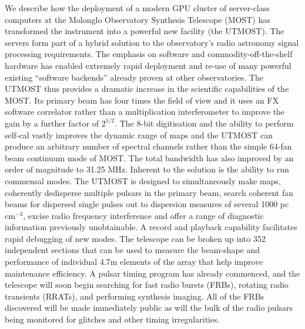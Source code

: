 We describe how the deployment of a modern GPU cluster of server-class computers at the Molonglo Observatory Synthesis Telescope (MOST) has transformed the instrument into a powerful new facility (the UTMOST). The servers form part of a hybrid solution to the observatory's radio astronomy signal processing requirements. The emphasis on software and commodity-off-the-shelf hardware has enabled extremely rapid deployment and re-use of many powerful existing ``software backends'' already proven at other observatories. The UTMOST thus provides a dramatic increase in the scientific capabilities of the MOST. Its primary beam has four times the field of view and it uses an FX software correlator rather than a multiplication interferometer to improve the gain by a further factor of $2^{1/2}$. The 8-bit digitisation and the ability to perform self-cal vastly improves the dynamic range of maps and the UTMOST can produce an arbitrary number of spectral channels rather than the simple 64-fan beam continuum mode of MOST. The total bandwidth has also improved by an order of magnitude to 31.25 MHz. Inherent to the solution is the ability to run commensal modes. The UTMOST is designed to simultaneously make maps, coherently dedisperse multiple pulsars in the primary beam, search coherent fan beams for dispersed single pulses out to dispersion measures of several 1000 pc cm$^{-3}$, excise radio frequency interference and offer a range of diagnostic information previously unobtainable. A record and playback capability facilitates rapid debugging of new modes. The telescope can be broken up into 352 independent sections that can be used to measure the beam-shape and performance of individual 4.7m elements of the array that help improve maintenance efficiency. A pulsar timing program has already commenced, and the telescope will soon begin searching for fast radio bursts (FRBs), rotating radio transients (RRATs), and performing synthesis imaging. All of the FRBs discovered will be made immediately public as will the bulk of the radio pulsars being monitored for glitches and other timing irregularities. 
